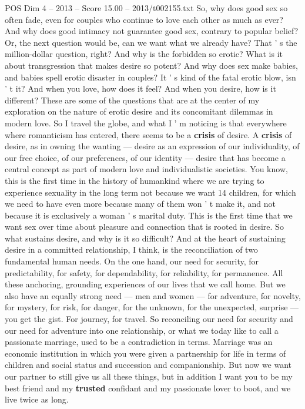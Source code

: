 \begin{textsample}{POS Dim 4 – 2013 – Score 15.00 – 2013/t002155.txt}  \label{ex:f4_pos_079}
So, why does good sex so often fade, even for couples who continue to love each other as much as ever?
And why does good intimacy not guarantee good sex, contrary to popular belief?
Or, the next question would be, can we want what we already have?
That ' s the million-dollar question, right?
And why is the forbidden so erotic?
What is it about transgression that makes desire so potent?
And why does sex make babies, and babies spell erotic disaster in couples?
It ' s kind of the fatal erotic blow, isn ' t it?
And when you love, how does it feel?
And when you desire, how is it different?
These are some of the questions that are at the center of my exploration on the nature of erotic desire and its concomitant dilemmas in modern love.
So I travel the globe, and what I ' m noticing is that everywhere where romanticism has entered, there seems to be a \textbf{crisis} of desire.
A \textbf{crisis} of desire, as in owning the wanting — desire as an expression of our individuality, of our free choice, of our preferences, of our identity — desire that has become a central concept as part of modern love and individualistic societies.
You know, this is the first time in the history of humankind where we are trying to experience sexuality in the long term not because we want 14 children, for which we need to have even more because many of them won ' t make it, and not because it is exclusively a woman ' s marital duty.
This is the first time that we want sex over time about pleasure and connection that is rooted in desire.
So what sustains desire, and why is it so difficult?
And at the heart of sustaining desire in a committed relationship, I think, is the reconciliation of two fundamental human needs.
On the one hand, our need for security, for predictability, for safety, for dependability, for reliability, for permanence.
All these anchoring, grounding experiences of our lives that we call home.
But we also have an equally strong need — men and women — for adventure, for novelty, for mystery, for risk, for danger, for the unknown, for the unexpected, surprise — you get the gist.
For journey, for travel.
So reconciling our need for security and our need for adventure into one relationship, or what we today like to call a passionate marriage, used to be a contradiction in terms.
Marriage was an economic institution in which you were given a partnership for life in terms of children and social status and succession and companionship.
But now we want our partner to still give us all these things, but in addition I want you to be my best friend and my \textbf{trusted} confidant and my passionate lover to boot, and we live twice as long.

\end{textsample}
